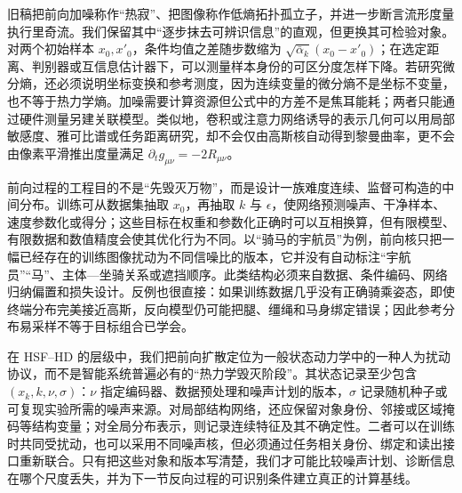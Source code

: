 旧稿把前向加噪称作“热寂”、把图像称作低熵拓扑孤立子，并进一步断言流形度量执行里奇流。我们保留其中“逐步抹去可辨识信息”的直观，但更换其可检验对象。对两个初始样本 $x_0,x'_0$，条件均值之差随步数缩为 $\sqrt{\bar\alpha_k}(x_0-x'_0)$；在选定距离、判别器或互信息估计器下，可以测量样本身份的可区分度怎样下降。若研究微分熵，还必须说明坐标变换和参考测度，因为连续变量的微分熵不是坐标不变量，也不等于热力学熵。加噪需要计算资源但公式中的方差不是焦耳能耗；两者只能通过硬件测量另建关联模型。类似地，卷积或注意力网络诱导的表示几何可以用局部敏感度、雅可比谱或任务距离研究，却不会仅由高斯核自动得到黎曼曲率，更不会由像素平滑推出度量满足 $\partial_tg_{\mu\nu}=-2R_{\mu\nu}$。

前向过程的工程目的不是“先毁灭万物”，而是设计一族难度连续、监督可构造的中间分布。训练可从数据集抽取 $x_0$，再抽取 $k$ 与 $\epsilon$，使网络预测噪声、干净样本、速度参数化或得分；这些目标在权重和参数化正确时可以互相换算，但有限模型、有限数据和数值精度会使其优化行为不同。以“骑马的宇航员”为例，前向核只把一幅已经存在的训练图像扰动为不同信噪比的版本，它并没有自动标注“宇航员”“马”、主体—坐骑关系或遮挡顺序。此类结构必须来自数据、条件编码、网络归纳偏置和损失设计。反例也很直接：如果训练数据几乎没有正确骑乘姿态，即使终端分布完美接近高斯，反向模型仍可能把腿、缰绳和马身绑定错误；因此参考分布易采样不等于目标组合已学会。

在 HSF--HD 的层级中，我们把前向扩散定位为一般状态动力学中的一种人为扰动协议，而不是智能系统普遍必有的“热力学毁灭阶段”。其状态记录至少包含 $(x_k,k,\nu,\sigma)$：$\nu$ 指定编码器、数据预处理和噪声计划的版本，$\sigma$ 记录随机种子或可复现实验所需的噪声来源。对局部结构网络，还应保留对象身份、邻接或区域掩码等结构变量；对全局分布表示，则记录连续特征及其不确定性。二者可以在训练时共同受扰动，也可以采用不同噪声核，但必须通过任务相关身份、绑定和读出接口重新联合。只有把这些对象和版本写清楚，我们才可能比较噪声计划、诊断信息在哪个尺度丢失，并为下一节反向过程的可识别条件建立真正的计算基线。
